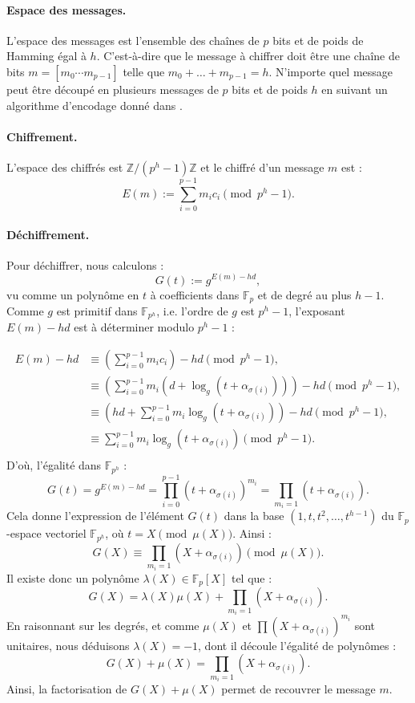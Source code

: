 \documentclass[a4paper, titlepage, 11pt]{article}
\theoremstyle{definition}
\theoremstyle{remark}
\def\Z{\mathbb Z}
\def\gf #1{\mathbb{F}_{#1}}
\begin{document}
\paragraph{Espace des messages.}L'espace des messages est l'ensemble des chaînes de $p$ bits et de poids de Hamming égal à $h$. C'est-à-dire que le message à chiffrer doit être une chaîne de bits $m = [m_0\cdots m_{p-1}]$ telle que $m_0+\dots + m_{p-1} = h$. N'importe quel message peut être découpé en plusieurs messages de $p$ bits et de poids $h$ en suivant un algorithme d'encodage donné dans \cite[IV.B.]{chorRivest1988}.

\paragraph{Chiffrement.}L'espace des chiffrés est $\Z/(p^h-1)\Z$ et le chiffré d'un message $m$ est :
$$E(m) := \sum_{i=0}^{p-1} m_ic_i \pmod{p^h-1}.$$
\paragraph{Déchiffrement.}Pour déchiffrer, nous calculons :
$$G(t) := g^{E(m) - hd},$$
vu comme un polynôme en $t$ à coefficients dans $\gf{p}$ et de degré au plus $h-1$. Comme $g$ est primitif dans $\gf{p^h}$, i.e. l'ordre de $g$ est $p^h-1$, l'exposant $E(m) - hd$ est à déterminer modulo $p^h-1$ :

\begin{align*}
E(m) - hd &\equiv \left(\sum_{i=0}^{p-1} m_ic_i\right) - hd \pmod{p^h-1}, \\
&\equiv \left(\sum_{i=0}^{p-1} m_i\left(d + \log_g\left(t + \alpha_{\sigma(i)}\right)\right)\right) - hd \pmod{p^h-1}, \\
&\equiv \left(hd + \sum_{i=0}^{p-1} m_i\log_g\left(t + \alpha_{\sigma(i)}\right)\right) - hd \pmod{p^h-1}, \\
&\equiv  \sum_{i=0}^{p-1} m_i\log_g\left(t + \alpha_{\sigma(i)}\right) \pmod{p^h-1}. \\
\end{align*}
D'où, l'égalité dans $\gf{p^h}$ :
$$G(t) = g^{E(m) - hd} = \prod_{i=0}^{p-1} \left(t+\alpha_{\sigma(i)}\right)^{m_i} = \prod_{m_i = 1} \left(t+\alpha_{\sigma(i)}\right).$$
Cela donne l'expression de l'élément $G(t)$ dans la base $(1,t,t^2, \dots, t^{h-1})$ du $\gf{p}$-espace vectoriel $\gf{p^h}$, où $t = X \pmod{\mu(X)}$. Ainsi :
$$G(X) \equiv \prod_{m_i = 1} \left(X+\alpha_{\sigma(i)}\right) \pmod{\mu(X)}.$$
Il existe donc un polynôme $\lambda(X) \in \gf{p}[X]$ tel que : $$G(X) = \lambda(X) \mu(X) + \prod_{m_i = 1} \left(X+\alpha_{\sigma(i)}\right).$$
En raisonnant sur les degrés, et comme $\mu(X)$ et $\prod \left(X+\alpha_{\sigma(i)}\right)^{m_i}$ sont unitaires, nous déduisons  $\lambda(X) = -1$, dont il découle l'égalité de polynômes :
$$G(X) + \mu(X) = \prod_{m_i = 1} \left(X+\alpha_{\sigma(i)}\right).$$
Ainsi, la factorisation de $G(X)+\mu(X)$ permet de recouvrer le message $m$.
\end{document}
